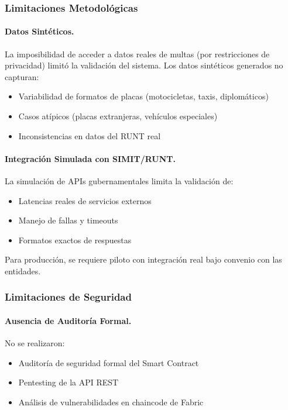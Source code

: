 \subsubsection{Limitaciones Metodológicas}

\paragraph{Datos Sintéticos.}
La imposibilidad de acceder a datos reales de multas (por restricciones de privacidad) limitó la validación del sistema. Los datos sintéticos generados no capturan:
\begin{itemize}
    \item Variabilidad de formatos de placas (motocicletas, taxis, diplomáticos)
    \item Casos atípicos (placas extranjeras, vehículos especiales)
    \item Inconsistencias en datos del RUNT real
\end{itemize}

\paragraph{Integración Simulada con SIMIT/RUNT.}
La simulación de APIs gubernamentales limita la validación de:
\begin{itemize}
    \item Latencias reales de servicios externos
    \item Manejo de fallas y timeouts
    \item Formatos exactos de respuestas
\end{itemize}

Para producción, se requiere piloto con integración real bajo convenio con las entidades.

\subsubsection{Limitaciones de Seguridad}

\paragraph{Ausencia de Auditoría Formal.}
No se realizaron:
\begin{itemize}
    \item Auditoría de seguridad formal del Smart Contract
    \item Pentesting de la API REST
    \item Análisis de vulnerabilidades en chaincode de Fabric
\end{itemize}

